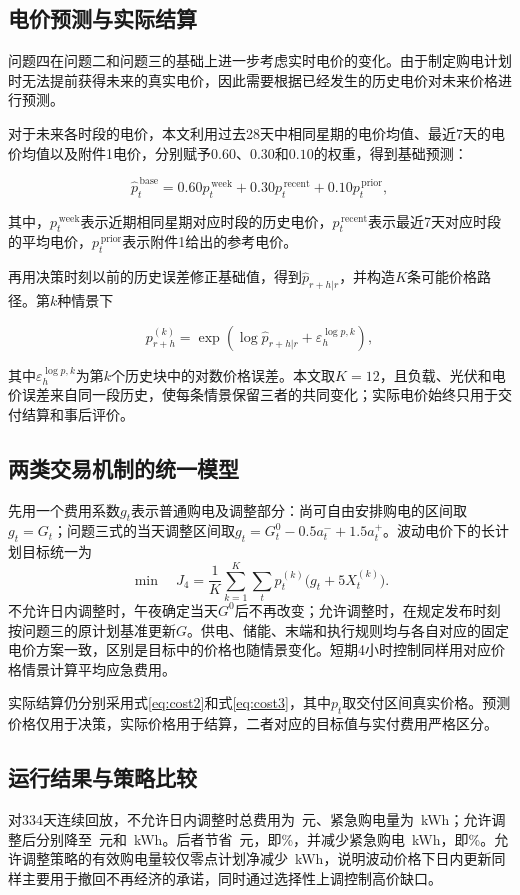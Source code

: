 \documentclass[UTF8,fontset=none,12pt,a4paper]{ctexart}
\begin{document}
\subsection{电价预测与实际结算}
问题四在问题二和问题三的基础上进一步考虑实时电价的变化。由于制定购电计划时无法提前获得未来的真实电价，因此需要根据已经发生的历史电价对未来价格进行预测。

对于未来各时段的电价，本文利用过去28天中相同星期的电价均值、最近7天的电价均值以及附件1电价，分别赋予$0.60$、$0.30$和$0.10$的权重，得到基础预测\cite{lago}：

\[
\hat p_t^{\,\mathrm{base}}
=
0.60p_t^{\,\mathrm{week}}
+
0.30p_t^{\,\mathrm{recent}}
+
0.10p_t^{\,\mathrm{prior}},
\]

其中，$p_t^{\,\mathrm{week}}$表示近期相同星期对应时段的历史电价，$p_t^{\,\mathrm{recent}}$表示最近7天对应时段的平均电价，$p_t^{\,\mathrm{prior}}$表示附件1给出的参考电价。

再用决策时刻以前的历史误差修正基础值，得到$\hat p_{r+h|r}$，并构造$K$条可能价格路径。第$k$种情景下

\[
p_{r+h}^{(k)}
=
\exp
\left(
\log \hat p_{r+h|r}
+
\varepsilon_{h}^{\log p,k}
\right),
\]

其中$\varepsilon_{h}^{\log p,k}$为第$k$个历史块中的对数价格误差。本文取$K=12$，且负载、光伏和电价误差来自同一段历史，使每条情景保留三者的共同变化；实际电价始终只用于交付结算和事后评价。

\subsection{两类交易机制的统一模型}
先用一个费用系数$g_t$表示普通购电及调整部分：尚可自由安排购电的区间取$g_t=G_t$；问题三式的当天调整区间取$g_t=G_t^0-0.5a_t^-+1.5a_t^+$。波动电价下的长计划目标统一为
\begin{equation}
 \min\quad J_4=\frac1K\sum_{k=1}^K\sum_t
          p_t^{(k)}\bigl(g_t+5X_t^{(k)}\bigr).
 \label{eq:q4}
\end{equation}
不允许日内调整时，午夜确定当天$G^0$后不再改变；允许调整时，在规定发布时刻按问题三的原计划基准更新$G$。供电、储能、末端和执行规则均与各自对应的固定电价方案一致，区别是目标中的价格也随情景变化。短期4小时控制同样用对应价格情景计算平均应急费用。

实际结算仍分别采用式\eqref{eq:cost2}和式\eqref{eq:cost3}，其中$p_t$取交付区间真实价格。预测价格仅用于决策，实际价格用于结算，二者对应的目标值与实付费用严格区分。

\subsection{运行结果与策略比较}
对334天连续回放，不允许日内调整时总费用为\QFourTwoCost\ 元、紧急购电量为\QFourTwoEmergencyEnergy\ kWh；允许调整后分别降至\QFourThreeCost\ 元和\QFourThreeEmergencyEnergy\ kWh。后者节省\QFourSaving\ 元，即\QFourSavingPct\%，并减少紧急购电\QFourEmergencySaving\ kWh，即\QFourEmergencySavingPct\%。允许调整策略的有效购电量较仅零点计划净减少\QFourAdjustmentNetDown\ kWh，说明波动价格下日内更新同样主要用于撤回不再经济的承诺，同时通过选择性上调控制高价缺口。
\end{document}
